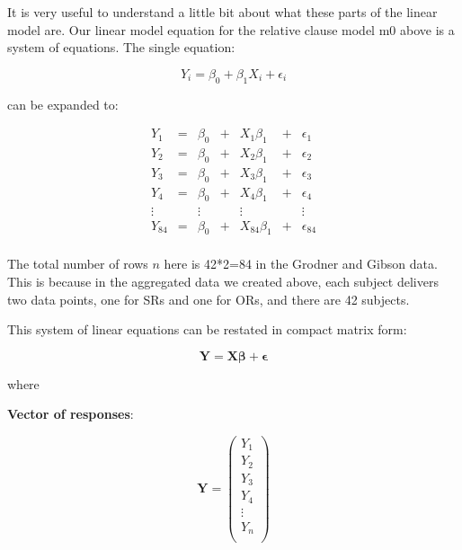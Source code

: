 \documentclass[12pt]{book}\usepackage[]{graphicx}\usepackage[]{color}
\begin{document}
It is very useful to understand a little bit about what these parts of the linear model are.
Our linear model equation for the relative clause model m0 above is a system of equations. The single equation:

\begin{equation} \label{eq1a}
Y_i = \beta_{0} + \beta_{1}X_i + \epsilon_i 
\end{equation}

\noindent
can be expanded to:

\begin{equation} \label{matrixeq1}
 \begin{array}{ccccccc}
Y_1    & = & \beta_0 & + & X_1 \beta_1 & + & \epsilon_1 \\
Y_2    & = & \beta_0 & + & X_2 \beta_1 & + & \epsilon_2 \\
Y_3    & = & \beta_0  & + & X_3 \beta_1 & + & \epsilon_3 \\
Y_4    & = & \beta_0 & + & X_4 \beta_1 & + & \epsilon_4 \\
\vdots &   & \vdots  &   & \vdots      &   & \vdots  \\
Y_{84}    & = & \beta_0 & + & X_{84} \beta_1 & + & \epsilon_{84} \\
\end{array} 
\end{equation}

The total number of rows $n$ here is 42*2=84 in the Grodner and Gibson data. This is because in the aggregated data we created above, each subject delivers two data points, one for SRs and one for ORs, and there are 42 subjects.

This system of linear equations can be restated in compact matrix form:

\begin{equation}
\mathbf{Y} = \mathbf{X} \mathbf{\beta} + \mathbf{\epsilon}
\end{equation}



\noindent
where

\textbf{Vector of responses}:

\begin{equation} \label{matrixsum}
\mathbf{Y} = \left( \begin{array}{c}
Y_1 \\
Y_2 \\
Y_3 \\
Y_4 \\
\vdots \\
Y_n \\
\end{array} \right)
\end{equation}
\end{document}
